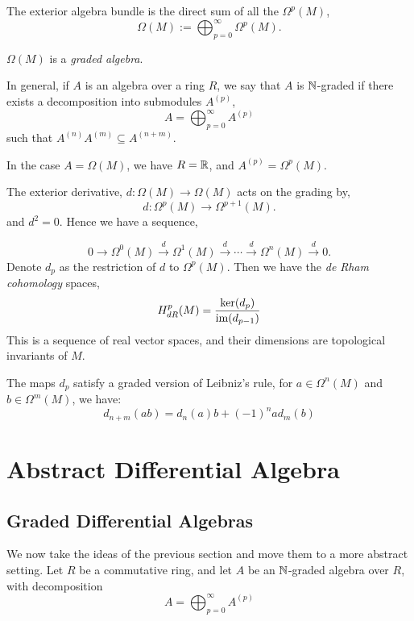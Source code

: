 The exterior algebra bundle is the direct sum of all the $\Omega^p(M)$,
\begin{equation*}
    \Omega(M) := \bigoplus_{p=0}^\infty \Omega^p(M).
\end{equation*}


$\Omega(M)$ is a \emph{graded algebra}.


In general, if $A$ is an algebra over a ring $R$, we say that $A$ is $\mathbb{N}$-graded
if there exists a decomposition into submodules $A^{(p)}$,
\begin{equation*}
    A = \bigoplus_{p=0}^\infty A^{(p)}
\end{equation*}
such that $A^{(n)}A^{(m)} \subseteq A^{(n+m)}$.

In the case $A = \Omega(M)$, we have $R = \mathbb{R}$, and $A^{(p)} = \Omega^p(M)$.

The exterior derivative, $d:\Omega(M)\rightarrow \Omega(M)$ acts on the grading by,
\begin{equation*}
    d:\Omega^p(M) \rightarrow \Omega^{p+1}(M).
\end{equation*}
and $d^2 = 0$. Hence we have a sequence,

\begin{equation*}
    0\rightarrow \Omega^{0}(M) \xrightarrow{d} \Omega^1(M) \xrightarrow{d} \cdots \xrightarrow{d} \Omega^n(M) \xrightarrow{d} 0.
\end{equation*}
Denote $d_p$ as the restriction of $d$ to $\Omega^p(M)$. Then we have the \emph{de Rham cohomology}
spaces,
\begin{equation*}
    H^p_{dR}(M) = \frac{\ker(d_{p})}{\operatorname{im}(d_{p-1})}
\end{equation*}
This is a sequence of real vector spaces, and their dimensions are topological
invariants of $M$.

The maps $d_p$ satisfy a graded version of Leibniz's rule, for $a \in \Omega^n(M)$
and $b \in \Omega^m(M)$, we have:
\begin{equation*}
    d_{n+m}(ab) = d_n(a)b+(-1)^nad_m(b)
\end{equation*}

\section{Abstract Differential Algebra}
\subsection{Graded Differential Algebras}
We now take the ideas of the previous section and move them to a more abstract setting.
Let $R$ be a commutative ring, and let $A$ be an $\mathbb{N}$-graded algebra over $R$, with decomposition
\begin{equation*}
    A = \bigoplus_{p=0}^\infty A^{(p)}
\end{equation*}

